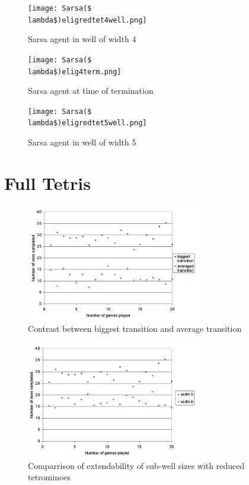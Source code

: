\documentclass{rucsthesis}
\begin{document}
\begin{figure}[h]
\centering
\texttt{[image: Sarsa(\$\\lambda\$)eligredtet4well.png]}
\caption{Sarsa agent in well of width 4}
\label{fig:comparemelax}
\end{figure}

\begin{figure}[h]
\centering
\texttt{[image: Sarsa(\$\\lambda\$)elig4term.png]}
\caption{Sarsa agent at time of termination}
\label{fig:comparemelax}
\end{figure}

\begin{figure}[h]
\centering
\texttt{[image: Sarsa(\$\\lambda\$)eligredtet5well.png]}
\caption{Sarsa agent in well of width 5}
\label{fig:comparemelax}
\end{figure}

\chapter{Full Tetris}

\begin{figure}[h]
\centering
\includegraphics[width=3in]{multisingle.png}
\caption{Contrast between biggest transition and average transition}
\label{fig:comparemelax}
\end{figure}

\begin{figure}[h]
\centering
\includegraphics[width=3in]{widthcomparrison.png}
\caption{Comparrison of extendability of sub-well sizes with reduced tetrominoes}
\label{fig:comparemelax}
\end{figure}
\end{document}
